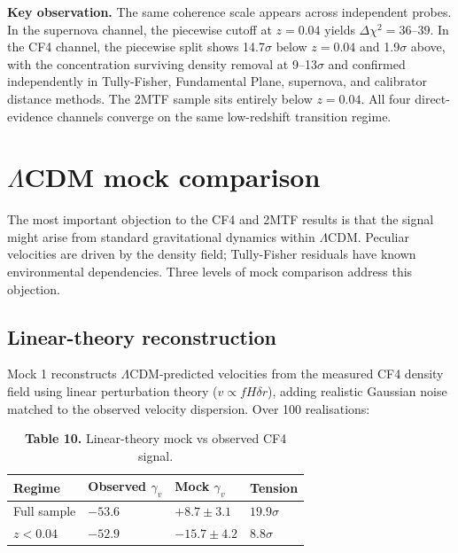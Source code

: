 \documentclass[11pt,a4paper]{article}
\begin{document}
\begin{mdframed}[linecolor=accent,linewidth=0.5pt,backgroundcolor=callout-bg,leftline=true,rightline=true,topline=true,bottomline=true,innerleftmargin=8pt,innerrightmargin=8pt,innertopmargin=6pt,innerbottommargin=6pt]
\textbf{Key observation.} The same coherence scale appears across independent probes. In the supernova channel, the piecewise cutoff at \(z = 0.04\) yields \(\Delta\chi^2 = 36\text{--}39\). In the CF4 channel, the piecewise split shows 14.7\(\sigma\) below \(z = 0.04\) and 1.9\(\sigma\) above, with the concentration surviving density removal at 9--13\(\sigma\) and confirmed independently in Tully-Fisher, Fundamental Plane, supernova, and calibrator distance methods. The 2MTF sample sits entirely below \(z = 0.04\). All four direct-evidence channels converge on the same low-redshift transition regime.
\end{mdframed}

\section{\(\Lambda\)CDM mock comparison}
\label{sec:sec7}
The most important objection to the CF4 and 2MTF results is that the signal might arise from standard gravitational dynamics within \(\Lambda\)CDM. Peculiar velocities are driven by the density field; Tully-Fisher residuals have known environmental dependencies. Three levels of mock comparison address this objection.

\subsection{Linear-theory reconstruction}
Mock 1 reconstructs \(\Lambda\)CDM-predicted velocities from the measured CF4 density field using linear perturbation theory (\(v \propto f H \delta r\)), adding realistic Gaussian noise matched to the observed velocity dispersion. Over 100 realisations:

\begin{table}[H]
\centering
\footnotesize
\caption{\textbf{Table 10.} Linear-theory mock vs observed CF4 signal.}
\begin{tabularx}{\linewidth}{l>{\RaggedRight\arraybackslash}X>{\RaggedRight\arraybackslash}X>{\RaggedRight\arraybackslash}X}
\toprule
\textbf{Regime} & \textbf{Observed \(\gamma_v\)} & \textbf{Mock \(\gamma_v\)} & \textbf{Tension} \tabularnewline
\midrule
Full sample & \(-53.6\) & \(+8.7 \pm 3.1\) & \(19.9\sigma\) \tabularnewline
\(z < 0.04\) & \(-52.9\) & \(-15.7 \pm 4.2\) & \(8.8\sigma\) \tabularnewline
\bottomrule
\end{tabularx}
\end{table}
\end{document}
